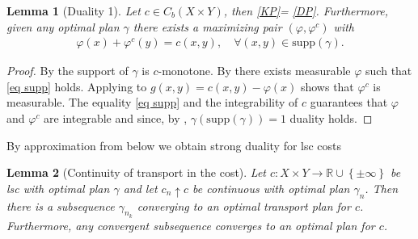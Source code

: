 \documentclass[
    a4paper,
    DIV=14,
    abstract=true,
    numbers=noenddot
]
{scrartcl}
\newtheorem{lemma}[lemma]{Lemma}
\theoremstyle{definition}
\newcommand{\set}[1]{\left\{#1\right\}}
\begin{document}
\begin{lemma}[Duality 1]\label{prop: Duality continuous}
    Let $c \in C_b (X \times Y)$, then \eqref{KP}= \eqref{DP}. Furthermore, given any optimal plan $\gamma$ there exists a maximizing pair $(\varphi, \varphi^c)$ with  
        \begin{align}\label{eq supp}
        \varphi (x)+ \varphi ^c(y)= c(x,y), \quad\forall (x,y) \in \mathrm{supp}(\gamma).
    \end{align}
\end{lemma}
\begin{proof}
    By  the support of $\gamma $ is $c$-monotone. By  there exists measurable $\varphi $ such that \eqref{eq supp} holds. 
  Applying  to $g(x,y)=c(x,y)- \varphi (x)$ shows that $\varphi^c $ is measurable. The equality \eqref{eq supp} and the integrability of $c$ guarantees that $\varphi $ and $\varphi ^c$ are integrable and since, by , $\gamma(\mathrm{supp}(\gamma))=1$  duality holds.
\end{proof}
By approximation from below we obtain strong duality for lsc costs
\begin{lemma}[Continuity of transport in the cost]\label{lemma: continuity in cost}
    Let $c : X \times Y \to \mathbb{R} \cup \set{\pm \infty}$ be lsc with optimal plan $\gamma$ and let $c_n \uparrow c$ be continuous with optimal plan $\gamma_n$. Then there is a subsequence $\gamma_{n_k}$ converging to an optimal transport plan for $c$. Furthermore, any convergent subsequence converges to an optimal plan for $c$.
\end{lemma}
\end{document}
